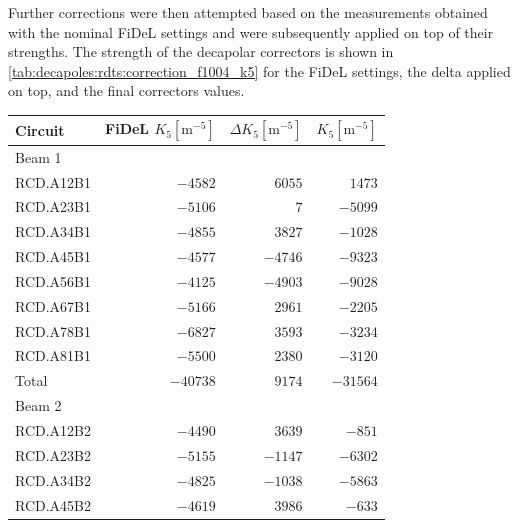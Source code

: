 Further corrections were then attempted based on the measurements obtained with the nominal FiDeL
settings and were subsequently applied on top of their strengths.
The strength of the decapolar correctors is shown in \cref{tab:decapoles:rdts:correction_f1004_k5}
for the FiDeL settings, the delta applied on top, and the final correctors values.

\begin{table}[!htb]
    \centering
    \begin{tabular}{lrrr}
    \toprule
    Circuit & FiDeL $K_5 [\textrm{m}^{-5}]$ & $\Delta K_5 [\textrm{m}^{-5}]$ & $K_5 [\textrm{m}^{-5}]$\\
    \midrule
    Beam 1 & \\
    \hspace{2mm}RCD.A12B1 &$-4582$ & $6055 $ &  $ 1473 $\\
    \hspace{2mm}RCD.A23B1 &$-5106$ & $7    $ &  $-5099 $\\
    \hspace{2mm}RCD.A34B1 &$-4855$ & $3827 $ &  $-1028 $\\
    \hspace{2mm}RCD.A45B1 &$-4577$ & $-4746$ &  $-9323 $\\
    \hspace{2mm}RCD.A56B1 &$-4125$ & $-4903$ &  $-9028 $\\
    \hspace{2mm}RCD.A67B1 &$-5166$ & $2961 $ &  $-2205 $\\
    \hspace{2mm}RCD.A78B1 &$-6827$ & $3593 $ &  $-3234 $\\
    \hspace{2mm}RCD.A81B1 &$-5500$ & $2380 $ &  $-3120 $\\
    \hspace{2mm}Total     &$-40738$& $9174 $ &  $-31564$\\
    Beam 2 & \\  %
    \hspace{2mm}RCD.A12B2 &$-4490$ & $3639 $ &  $-851  $\\
    \hspace{2mm}RCD.A23B2 &$-5155$ & $-1147$ &  $-6302 $\\
    \hspace{2mm}RCD.A34B2 &$-4825$ & $-1038$ &  $-5863 $\\
    \hspace{2mm}RCD.A45B2 &$-4619$ & $3986 $ &  $-633  $\\

\end{tabular}
\end{table}
